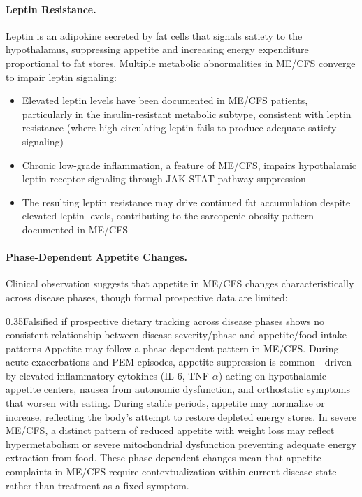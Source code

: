 \paragraph{Leptin Resistance.}
Leptin is an adipokine secreted by fat cells that signals satiety to the hypothalamus, suppressing appetite and increasing energy expenditure proportional to fat stores. Multiple metabolic abnormalities in ME/CFS converge to impair leptin signaling:

\begin{itemize}
    \item Elevated leptin levels have been documented in ME/CFS patients, particularly in the insulin-resistant metabolic subtype, consistent with leptin resistance (where high circulating leptin fails to produce adequate satiety signaling)~\cite{Hoel2021metabolicphenotypes}
    \item Chronic low-grade inflammation, a feature of ME/CFS, impairs hypothalamic leptin receptor signaling through JAK-STAT pathway suppression
    \item The resulting leptin resistance may drive continued fat accumulation despite elevated leptin levels, contributing to the sarcopenic obesity pattern documented in ME/CFS
\end{itemize}

\paragraph{Phase-Dependent Appetite Changes.}
Clinical observation suggests that appetite in ME/CFS changes characteristically across disease phases, though formal prospective data are limited:

\begin{speculation}{0.35}{Falsified if prospective dietary tracking across disease phases shows no consistent relationship between disease severity/phase and appetite/food intake patterns}
\label{spec:appetite-phases}
Appetite may follow a phase-dependent pattern in ME/CFS. During acute exacerbations and PEM episodes, appetite suppression is common---driven by elevated inflammatory cytokines (IL-6, TNF-$\alpha$) acting on hypothalamic appetite centers, nausea from autonomic dysfunction, and orthostatic symptoms that worsen with eating. During stable periods, appetite may normalize or increase, reflecting the body's attempt to restore depleted energy stores. In severe ME/CFS, a distinct pattern of reduced appetite with weight loss may reflect hypermetabolism or severe mitochondrial dysfunction preventing adequate energy extraction from food. These phase-dependent changes mean that appetite complaints in ME/CFS require contextualization within current disease state rather than treatment as a fixed symptom.
\end{speculation}

